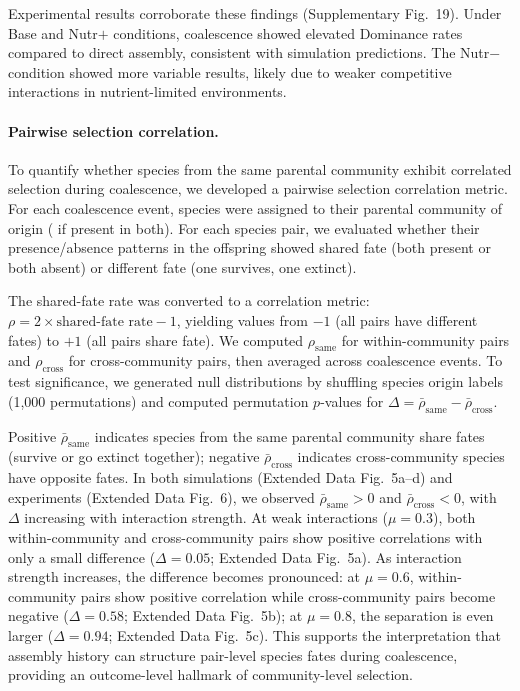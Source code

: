 Experimental results corroborate these findings (Supplementary Fig.~19). Under Base and Nutr$+$ conditions, coalescence showed elevated Dominance rates compared to direct assembly, consistent with simulation predictions. The Nutr$-$ condition showed more variable results, likely due to weaker competitive interactions in nutrient-limited environments.

\paragraph{Pairwise selection correlation.}
To quantify whether species from the same parental community exhibit correlated selection during coalescence, we developed a pairwise selection correlation metric. For each coalescence event, species were assigned to their parental community of origin ( if present in both). For each species pair, we evaluated whether their presence/absence patterns in the offspring showed shared fate (both present or both absent) or different fate (one survives, one extinct).

The shared-fate rate was converted to a correlation metric: $\rho = 2 \times \text{shared-fate rate} - 1$, yielding values from $-1$ (all pairs have different fates) to $+1$ (all pairs share fate). We computed $\rho_{\text{same}}$ for within-community pairs and $\rho_{\text{cross}}$ for cross-community pairs, then averaged across coalescence events. To test significance, we generated null distributions by shuffling species origin labels (1,000 permutations) and computed permutation $p$-values for $\Delta = \bar{\rho}_{\text{same}} - \bar{\rho}_{\text{cross}}$.

Positive $\bar{\rho}_{\text{same}}$ indicates species from the same parental community share fates (survive or go extinct together); negative $\bar{\rho}_{\text{cross}}$ indicates cross-community species have opposite fates. In both simulations (Extended Data Fig.~5a--d) and experiments (Extended Data Fig.~6), we observed $\bar{\rho}_{\text{same}} > 0$ and $\bar{\rho}_{\text{cross}} < 0$, with $\Delta$ increasing with interaction strength. At weak interactions ($\mu = 0.3$), both within-community and cross-community pairs show positive correlations with only a small difference ($\Delta = 0.05$; Extended Data Fig.~5a). As interaction strength increases, the difference becomes pronounced: at $\mu = 0.6$, within-community pairs show positive correlation while cross-community pairs become negative ($\Delta = 0.58$; Extended Data Fig.~5b); at $\mu = 0.8$, the separation is even larger ($\Delta = 0.94$; Extended Data Fig.~5c). This supports the interpretation that assembly history can structure pair-level species fates during coalescence, providing an outcome-level hallmark of community-level selection.

